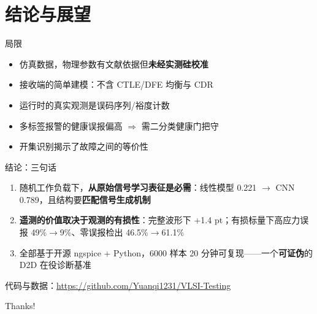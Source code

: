 \documentclass[11pt]{beamer}
\newcommand{\hl}[1]{\textcolor{deepred}{\textbf{#1}}}
\begin{document}
\section{结论与展望}

\begin{frame}{局限}
    \begin{itemize}
        \item 仿真数据，物理参数有文献依据但\hl{未经实测硅校准}
        \item 接收端的简单建模：不含 CTLE/DFE 均衡与 CDR
        \item 运行时的真实观测是误码序列/裕度计数
        \item 多标签报警的健康误报偏高 $\Rightarrow$ 需二分类健康门把守
        \item 开集识别揭示了故障之间的等价性
    \end{itemize}
\end{frame}

\begin{frame}{结论：三句话}
    \begin{enumerate}
        \item 随机工作负载下，\hl{从原始信号学习表征是必需}：线性模型 0.221 $\to$ CNN 0.789，且结构要\hl{匹配信号生成机制}
        \item \hl{遥测的价值取决于观测的有损性}：完整波形下 +1.4 pt；有损标量下高应力误报 49\%$\to$9\%、零误报检出 46.5\%$\to$61.1\%
        \item 全部基于开源 ngspice + Python，6000 样本 20 分钟可复现——一个\hl{可证伪}的 D2D 在役诊断基准
    \end{enumerate}
    \vspace{0.8em}
    \begin{center}
        \small 代码与数据：\url{https://github.com/Yuanqi1231/VLSI-Testing}
    \end{center}
\end{frame}

\begin{frame}
    \begin{center}
        {\Huge\calligra Thanks!}
    \end{center}
\end{frame}
\end{document}
